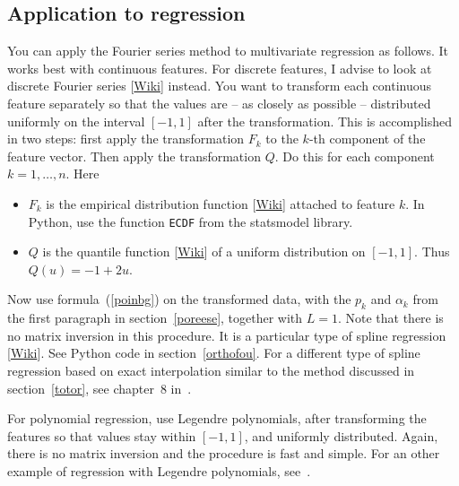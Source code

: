 \documentclass[oneside,10pt]{book}
\begin{document}
\subsection{Application to regression}\label{oiuty}

You can apply the Fourier series method to multivariate regression as follows. It works best with continuous features. For discrete features, I advise to look at \textcolor{index}{discrete Fourier series} [\href{https://en.wikipedia.org/wiki/Discrete_Fourier_series}{Wiki}] instead. You want to transform each continuous feature separately so that the values are -- as closely as possible -- distributed uniformly on the interval $[-1, 1]$ after the transformation. This is accomplished in two steps: first apply the transformation $F_k$ to the $k$-th component of the feature vector. Then apply the transformation $Q$. Do this for each component $k=1,\dots,n$.  Here \vspace{1ex}

\begin{itemize}
\item $F_k$ is the 
\textcolor{index}{empirical distribution function} [\href{https://en.wikipedia.org/wiki/Empirical_distribution_function}{Wiki}] attached to feature $k$. In Python, use the function \texttt{ECDF} from the statsmodel library. 
\item $Q$ is the \textcolor{index}{quantile function} [\href{https://en.wikipedia.org/wiki/Quantile_function}{Wiki}] of a uniform distribution on $[-1, 1]$. Thus $Q(u) = -1 + 2u$.
\end{itemize} \vspace{1ex}

\noindent Now use formula~(\ref{poinbg}) on the transformed data, with the $p_k$ and $\alpha_k$ from the first paragraph 
in section~\ref{poreese}, together with $L=1$. Note that there is no matrix inversion in this procedure. It is a 
particular type of \textcolor{index}{spline regression} [\href{https://en.wikipedia.org/wiki/Multivariate_adaptive_regression_spline}{Wiki}]. See Python code in section~\ref{orthofou}. For a different type of spline regression based on exact interpolation similar to the
 method discussed in section~\ref{totor}, see chapter~8 in~\cite{vgelsevier}. 

For polynomial regression, use Legendre polynomials, after transforming the features so that values stay within $[-1, 1]$, and uniformly distributed. Again, there is no matrix inversion and the procedure is fast and simple. For an other example of regression
 with Legendre polynomials, see~\cite{54re2022w}. 
\end{document}
